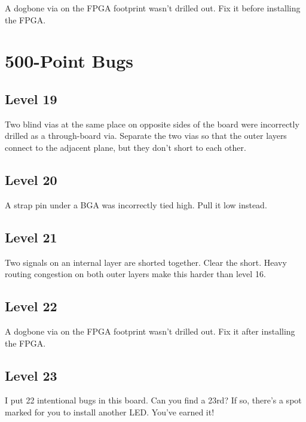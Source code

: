 \documentclass{article}
\begin{document}
A dogbone via on the FPGA footprint wasn't drilled out. Fix it before installing the FPGA.

\pagebreak
\section{500-Point Bugs}

\subsection{Level 19}

Two blind vias at the same place on opposite sides of the board were incorrectly drilled as a through-board via.
Separate the two vias so that the outer layers connect to the adjacent plane, but they don't short to each other.

\subsection{Level 20}

A strap pin under a BGA was incorrectly tied high. Pull it low instead.

\subsection{Level 21}

Two signals on an internal layer are shorted together. Clear the short. Heavy routing congestion on both outer layers
make this harder than level 16.

\subsection{Level 22}

A dogbone via on the FPGA footprint wasn't drilled out. Fix it after installing the FPGA.

\subsection{Level 23}

I put 22 intentional bugs in this board. Can you find a 23rd? If so, there's a spot marked for you to install another
LED. You've earned it!
\end{document}
